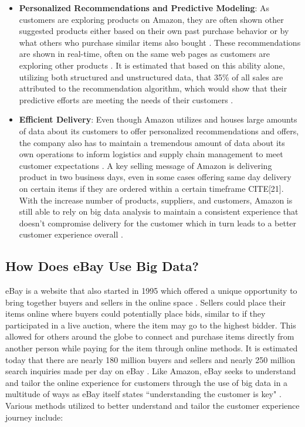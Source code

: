 \documentclass[sigconf]{acmart}
\begin{document}
\begin{itemize}
 \item \textbf{Personalized Recommendations and Predictive Modeling}: As customers are exploring products on Amazon, they are often shown other suggested products either based on their own past purchase behavior or by what others who purchase similar items also bought \cite{Akter2016}. These recommendations are shown in real-time, often on the same web pages as customers are exploring other products \cite{Akter2016}. It is estimated that based on this ability alone, utilizing both structured and unstructured data, that 35\% of all sales are attributed to the recommendation algorithm, which would show that their predictive efforts are meeting the needs of their customers \cite{Akter2016}.  
 
 \item \textbf{Efficient Delivery}: Even though Amazon utilizes and houses large amounts of data about its customers to offer personalized recommendations and offers, the company also has to maintain a tremendous amount of data about its own operations to inform logistics and supply chain management to meet customer expectations \cite{Akter2016}. A key selling message of Amazon is delivering product in two business days, even in some cases offering same day delivery on certain items if they are ordered within a certain timeframe CITE[21]. With the increase number of products, suppliers, and customers, Amazon is still able to rely on big data analysis to maintain a consistent experience that doesn't compromise delivery for the customer which in turn leads to a better customer experience overall \cite{Akter2016}. 
 
 \end{itemize}

  \subsection{How Does eBay Use Big Data?}
  eBay is a website that also started in 1995 which offered a unique opportunity to bring together buyers and sellers in the online space \cite{Ebay2017}. Sellers could place their items online where buyers could potentially place bids, similar to if they participated in a live auction, where the item may go to the highest bidder. This allowed for others around the globe to connect and purchase items directly from another person while paying for the item through online methods. It is estimated today that there are nearly 180 million buyers and sellers and nearly 250 million search inquiries made per day on eBay \cite{Lui2012}. Like Amazon, eBay seeks to understand and tailor the online experience for customers through the use of big data in a multitude of ways as eBay itself states ``understanding the customer is key" \cite{Sararn2014}. Various methods utilized to better understand and tailor the customer experience journey include:
  
\end{document}
